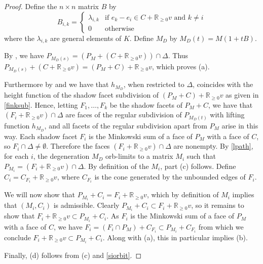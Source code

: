 \documentclass[12pt]{amsart}
\newcommand{\mb}{\mathbb}
\newcommand{\Vt}{{\operatorname{Vert}}}
\theoremstyle{plain}
\theoremstyle{definition}
\theoremstyle{remark}
\begin{document}
\begin{proof}

Define the $n \times n$ matrix $B$ by
\[
B_{i,k}= \begin{cases}
\lambda_{i,k} & \mbox{if $e_k-e_i \in C+\mb{R}_{\ge 0}v$ and $k \ne i$}\\
0 & \mbox{otherwise}
\end{cases}
\]
where the $\lambda_{i,k}$ are general elements of $K$. Define $M_D$ by $M_D(t) = M(1+tB)$.

By , we have $P_{M_D(s)}=(P_M+(C+\mb{R}_{\ge 0}v))\cap \Delta$. Thus $P_{M_D(s)}+(C+\mb{R}_{\ge 0}v)=(P_M+C)+\mb{R}_{\ge 0}v$, which proves (a).

Furthermore by  and  we have that $h_{M_D}$, when restricted to $\Delta$, coincides with the height function of the shadow facet subdivision of $(P_M+C)+\mb{R}_{\ge 0}v$ as given in \cref{finksub}. Hence, letting $F_1,\ldots,F_k$ be the shadow facets of $P_M+C$, we have that $(F_i+\mb{R}_{\ge 0}v)\cap \Delta$ are faces of the regular subdivision of $P_{M_D(t)}$ with lifting function $h_{M_D}$, and all facets of the regular subdivision apart from $P_M$ arise in this way. Each shadow facet $F_i$ is the Minkowski sum of a face of $P_M$ with a face of $C$, so $F_i \cap \Delta \ne \emptyset$. Therefore the faces $(F_i+\mb{R}_{\ge 0}v)\cap \Delta$ are nonempty. By \cref{lpath}, for each $i$, the degeneration $M_D$ orb-limits to a matrix $M_i$ such that $P_{M_i} = (F_i+\mb{R}_{\ge 0}v)\cap \Delta$. By definition of the $M_i$, part (c) follows. Define $C_i = C_{F_i} + \mb{R}_{\ge 0} v$, where $C_{F_i}$ is the cone generated by the unbounded edges of $F_i$.

We will now show that $P_{M_i}+C_i=F_i+\mb{R}_{\ge 0}v$, which by definition of $M_i$ implies that $(M_i,C_i)$ is admissible. Clearly $P_{M_i}+C_i\subset F_i+\mb{R}_{\ge 0}v$, so it remains to show that $F_i+\mb{R}_{\ge 0}v \subset P_{M_i}+C_i$. As $F_i$ is the Minkowski sum of a face of $P_M$ with a face of $C$, we have $F_i=(F_i \cap P_M)+C_{F_i} \subset P_{M_i}+C_{F_i}$ from which we conclude $F_i+\mb{R}_{\ge 0}v \subset P_{M_i}+C_i$. Along with (a), this in particular implies (b).

Finally, (d) follows from (c) and \cref{siorbit}.

\end{proof}
\end{document}
